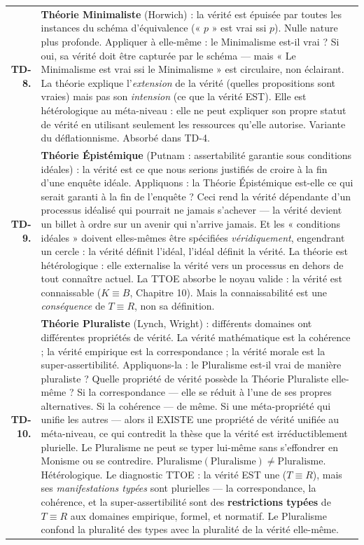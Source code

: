 \documentclass[10pt, openany, oneside]{book}
\begin{document}
{\begin{tabular}{r p{}}
\textbf{TD-8.} & \textbf{Théorie Minimaliste} (Horwich) : la vérité est épuisée par toutes les instances du schéma d'équivalence (« $p$ » est vrai ssi $p$). Nulle nature plus profonde. Appliquer à elle-même : le Minimalisme est-il vrai ? Si oui, sa vérité doit être capturée par le schéma --- mais « Le Minimalisme est vrai ssi le Minimalisme » est circulaire, non éclairant. La théorie explique l'\textit{extension} de la vérité (quelles propositions sont vraies) mais pas son \textit{intension} (ce que la vérité EST). Elle est hétérologique au méta-niveau : elle ne peut expliquer son propre statut de vérité en utilisant seulement les ressources qu'elle autorise. Variante du déflationnisme. Absorbé dans TD-4. \\[0.3em]
\textbf{TD-9.} & \textbf{Théorie Épistémique} (Putnam : assertabilité garantie sous conditions idéales) : la vérité est ce que nous serions justifiés de croire à la fin d'une enquête idéale. Appliquons : la Théorie Épistémique est-elle ce qui serait garanti à la fin de l'enquête ? Ceci rend la vérité dépendante d'un processus idéalisé qui pourrait ne jamais s'achever --- la vérité devient un billet à ordre sur un avenir qui n'arrive jamais. Et les « conditions idéales » doivent elles-mêmes être spécifiées \textit{véridiquement}, engendrant un cercle : la vérité définit l'idéal, l'idéal définit la vérité. La théorie est hétérologique : elle externalise la vérité vers un processus en dehors de tout connaître actuel. La TTOE absorbe le noyau valide : la vérité est connaissable ($K \equiv B$, Chapitre 10). Mais la connaissabilité est une \textit{conséquence} de $T \equiv R$, non sa définition.\\[0.3em]
\textbf{TD-10.} & \textbf{Théorie Pluraliste} (Lynch, Wright) : différents domaines ont différentes propriétés de vérité. La vérité mathématique est la cohérence ; la vérité empirique est la correspondance ; la vérité morale est la super-assertibilité. Appliquons-la : le Pluralisme est-il vrai de manière pluraliste ? Quelle propriété de vérité possède la Théorie Pluraliste elle-même ? Si la correspondance --- elle se réduit à l'une de ses propres alternatives. Si la cohérence --- de même. Si une méta-propriété qui unifie les autres --- alors il EXISTE une propriété de vérité unifiée au méta-niveau, ce qui contredit la thèse que la vérité est irréductiblement plurielle. Le Pluralisme ne peut se typer lui-même sans s'effondrer en Monisme ou se contredire. $\text{Pluralisme}(\text{Pluralisme}) \neq \text{Pluralisme}$. Hétérologique. Le diagnostic TTOE : la vérité EST une ($T \equiv R$), mais ses \textit{manifestations typées} sont plurielles --- la correspondance, la cohérence, et la super-assertibilité sont des \textbf{restrictions typées} de $T \equiv R$ aux domaines empirique, formel, et normatif. Le Pluralisme confond la pluralité des types avec la pluralité de la vérité elle-même. \\[0.3em]

\end{tabular}}
\end{document}
